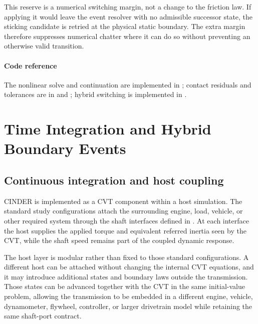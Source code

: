 \documentclass[11pt]{report}
\numberwithin{equation}{section}
\begin{document}
This reserve is a numerical switching margin, not a change to the friction
law.  If applying it would leave the event resolver with no admissible
successor state, the sticking candidate is retried at the physical static
boundary.  The extra margin therefore suppresses numerical chatter where it
can do so without preventing an otherwise valid transition.

\paragraph{Code reference}
The nonlinear solve and continuation are implemented in
;
contact residuals and tolerances are in
and
;
hybrid switching is implemented in
.

\section{Time Integration and Hybrid Boundary Events}
\label{app:num_time_integration}

\subsection{Continuous integration and host coupling}
\label{app:num_continuous_integration}

CINDER is implemented as a CVT component within a host simulation.  The
standard study configurations attach the surrounding engine, load, vehicle, or
other required system through the shaft interfaces defined in
.  At each interface the host supplies the applied
torque and equivalent referred inertia seen by the CVT, while the shaft speed
remains part of the coupled dynamic response.

The host layer is modular rather than fixed to those standard configurations.
A different host can be attached without changing the internal CVT equations,
and it may introduce additional states and boundary laws outside the
transmission.  Those states can be advanced together with the CVT in the same
initial-value problem, allowing the transmission to be embedded in a different
engine, vehicle, dynamometer, flywheel, controller, or larger drivetrain model
while retaining the same shaft-port contract.
\end{document}
